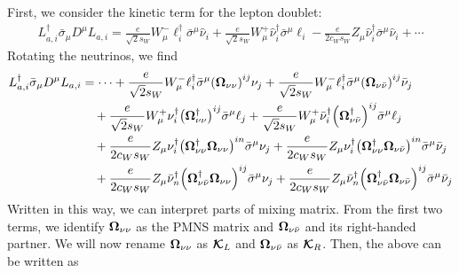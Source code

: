 First, we consider the kinetic term for the lepton doublet:
\begin{align}
	L^{\dagger}_{a,i}\bar{\sigma}_{\mu}D^{\mu}L_{a,i} =
	\frac{e}{\sqrt{2}s_{W}}W^{-}_{\mu}\ell_{i}^{\dagger}\bar{\sigma}^{\mu}\hat{\nu}_{i}
	+\frac{e}{\sqrt{2}s_{W}}W^{+}_{\mu}\hat{\nu}_{i}^{\dagger}\bar{\sigma}^{\mu}\ell_{i}
	-\frac{e}{2c_{W}s_{W}}Z_{\mu}\hat{\nu}_{i}^{\dagger}\bar{\sigma}^{\mu}\hat{\nu}_{i} + \cdots
\end{align}
Rotating the neutrinos, we find
\begin{align}
	L^{\dagger}_{a,i}\bar{\sigma}_{\mu}D^{\mu}L_{a,i}
	 & = \cdots
	+\frac{e}{\sqrt{2}s_{W}}W^{-}_{\mu}\ell_{i}^{\dagger}\bar{\sigma}^{\mu}
	\qty(\bm{\Omega}_{\nu\nu})^{ij}\nu_{j}
	+\frac{e}{\sqrt{2}s_{W}}W^{-}_{\mu}\ell_{i}^{\dagger}\bar{\sigma}^{\mu}
	\qty(\bm{\Omega}_{\nu\bar{\nu}})^{ij}\bar{\nu}_{j}\notag                                                                                    \\
	 & \quad
	+\frac{e}{\sqrt{2}s_{W}}W^{+}_{\mu}\nu_{i}^{\dagger}
	\qty(\bm{\Omega}_{\nu\nu}^{\dagger})^{ij}\bar{\sigma}^{\mu}\ell_{j}
	+\frac{e}{\sqrt{2}s_{W}}W^{+}_{\mu}\bar{\nu}_{i}^{\dagger}
	\qty(\bm{\Omega}_{\nu\bar{\nu}}^{\dagger})^{ij}\bar{\sigma}^{\mu}\ell_{j}\notag                                                        \\
	 & \quad
	+\frac{e}{2c_{W}s_{W}}Z_{\mu}\nu_{i}^{\dagger}\qty(\bm{\Omega}_{\nu\nu}^{\dagger}\bm{\Omega}_{\nu\nu})^{in}\bar{\sigma}^{\mu}\nu_{j}
	+\frac{e}{2c_{W}s_{W}}Z_{\mu}\nu_{i}^{\dagger}\qty(\bm{\Omega}_{\nu\nu}^{\dagger}\bm{\Omega}_{\nu\bar{\nu}})^{in}\bar{\sigma}^{\mu}\bar{\nu}_{j}\notag \\
	 & \quad
	+\frac{e}{2c_{W}s_{W}}Z_{\mu}\bar{\nu}_{n}^{\dagger}\qty(\bm{\Omega}_{\nu\bar{\nu}}^{\dagger}\bm{\Omega}_{\nu\nu})^{ij}\bar{\sigma}^{\mu}\nu_{j}
	+\frac{e}{2c_{W}s_{W}}Z_{\mu}\bar{\nu}_{n}^{\dagger}\qty(\bm{\Omega}_{\nu\bar{\nu}}^{\dagger}\bm{\Omega}_{\nu\bar{\nu}})^{ij}\bar{\sigma}^{\mu}\bar{\nu}_{j}\notag
\end{align}
Written in this way, we can interpret parts of mixing matrix. From the first two terms, we identify
\(\bm{\Omega}_{\nu\nu}\) as the PMNS matrix and
\(\bm{\Omega}_{\nu\bar{\nu}}\) and its right-handed partner. We will now rename
\(\bm{\Omega}_{\nu\nu}\) as \(\bm{\mathcal{K}}_{L}\) and
\(\bm{\Omega}_{\nu\bar{\nu}}\) as \(\bm{\mathcal{K}}_{R}\). Then, the above can be
written as
